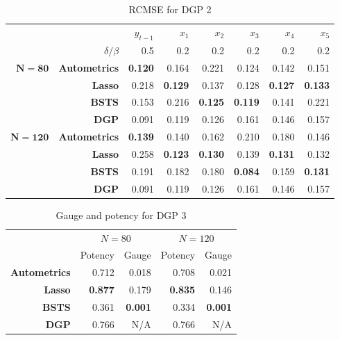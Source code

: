 \begin{table}[htbp]
  \centering
   \begin{tabular}{r|r|rrrrrr}

          &       & $y_{t-1}$ & $x_{1}$ & $x_{2}$ & $x_{3}$ & $x_{4}$ & $x_{5}$ \\
          & $\delta/\beta$ & 0.5   & 0.2   & 0.2   & 0.2 & 0.2   & 0.2 \\
             \hline
          \hline
    $\bm{N=80}$ & \textbf{Autometrics} & \textbf{0.120} & 0.164 & 0.221 & 0.124 & 0.142 & 0.151 \\
    \textbf{} & \textbf{Lasso} & 0.218 & \textbf{0.129} & 0.137 & 0.128 & \textbf{0.127} & \textbf{0.133} \\
    \textbf{} & \textbf{BSTS} & 0.153 & 0.216 & \textbf{0.125} & \textbf{0.119} & 0.141 & 0.221 \\
    \hline
    \textbf{} & \textbf{DGP} & 0.091 & 0.119 & 0.126 & 0.161 & 0.146 & 0.157 \\
    \hline
    \hline
    $\bm{N=120} $& \textbf{Autometrics} & \textbf{0.139} & 0.140 & 0.162 & 0.210 & 0.180 & 0.146 \\
    \textbf{} & \textbf{Lasso} & 0.258 & \textbf{0.123} & \textbf{0.130} & 0.139 & \textbf{0.131} & 0.132 \\
    \textbf{} & \textbf{BSTS} & 0.191 & 0.182 & 0.180 & \textbf{0.084} & 0.159 & \textbf{0.131} \\
    \hline
    \textbf{} & \textbf{DGP} & 0.091 & 0.119 & 0.126 & 0.161 & 0.146 & 0.157 \\

    \end{tabular}%
      \caption{RCMSE for DGP 2}
  \label{DGP2CMSE}%
\end{table}%

\begin{table}[htbp]
  \centering

    \begin{tabular}{r|r|r|r|r}

         & \multicolumn{2}{|c|}{\textbf{$N=80$}} & \multicolumn{2}{|c}{\textbf{$N=120$}} \\
            & Potency           & Gauge           & Potency            & Gauge           \\
          \hline
    \textbf{Autometrics} & 0.712 & 0.018 & 0.708 & 0.021 \\
    \textbf{Lasso} & \textbf{0.877} & 0.179 & \textbf{0.835} & 0.146 \\
    \textbf{BSTS} & 0.361 & \textbf{0.001} & 0.334 & \textbf{0.001} \\
    \hline
    \textbf{DGP} & 0.766 & N/A   & 0.766 & N/A \\

    \end{tabular}%
      \caption{Gauge and potency for DGP 3}
  \label{DGP3GP}%
\end{table}%



